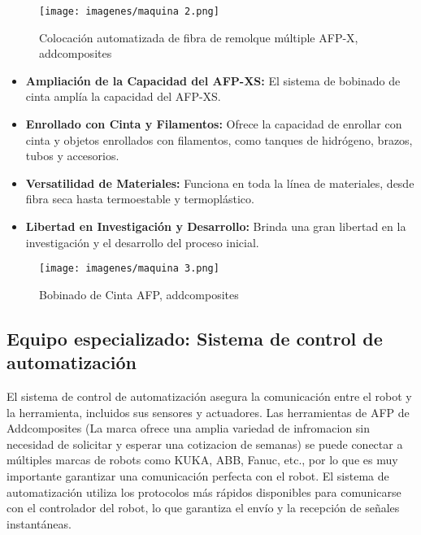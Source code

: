 \begin{enumerate}[label=\arabic*.]
\begin{figure}[h]
    \centering
    \texttt{[image: imagenes/maquina 2.png]}
    \caption{Colocación automatizada de fibra de remolque múltiple  AFP-X, addcomposites}
    \label{fig:enter-label}
\end{figure}

 


\begin{itemize}
    \item \textbf{Ampliación de la Capacidad del AFP-XS:}
        El sistema de bobinado de cinta amplía la capacidad del AFP-XS.

    \item \textbf{Enrollado con Cinta y Filamentos:}
        Ofrece la capacidad de enrollar con cinta y objetos enrollados con filamentos, como tanques de hidrógeno, brazos, tubos y accesorios.

    \item \textbf{Versatilidad de Materiales:}
        Funciona en toda la línea de materiales, desde fibra seca hasta termoestable y termoplástico.

    \item \textbf{Libertad en Investigación y Desarrollo:}
        Brinda una gran libertad en la investigación y el desarrollo del proceso inicial.

\end{itemize}

\begin{figure}[h]
    \centering
    \texttt{[image: imagenes/maquina 3.png]}
    \caption{Bobinado de Cinta AFP, addcomposites}
    \label{fig:enter-label}
\end{figure}


\subsection{Equipo especializado: Sistema de control de automatización}

El sistema de control de automatización asegura la comunicación entre el robot y la herramienta, incluidos sus sensores y actuadores. Las herramientas de  AFP de Addcomposites (La marca ofrece una amplia variedad de infromacion sin necesidad de solicitar y esperar una cotizacion de semanas) se puede conectar a múltiples marcas de robots como KUKA, ABB, Fanuc, etc., por lo que es muy importante garantizar una comunicación perfecta con el robot. El sistema de automatización utiliza los protocolos más rápidos disponibles para comunicarse con el controlador del robot, lo que garantiza el envío y la recepción de señales instantáneas.



\end{enumerate}
